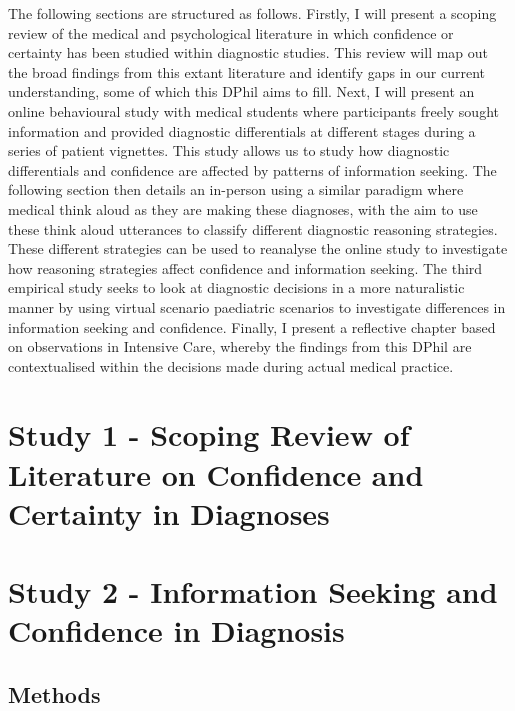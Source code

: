 \documentclass[a4paper, nobind]{templates/ociamthesis}
\begin{document}
The following sections are structured as follows. Firstly, I will present a scoping review of the medical and psychological literature in which confidence or certainty has been studied within diagnostic studies. This review will map out the broad findings from this extant literature and identify gaps in our current understanding, some of which this DPhil aims to fill. Next, I will present an online behavioural study with medical students where participants freely sought information and provided diagnostic differentials at different stages during a series of patient vignettes. This study allows us to study how diagnostic differentials and confidence are affected by patterns of information seeking. The following section then details an in-person using a similar paradigm where medical think aloud as they are making these diagnoses, with the aim to use these think aloud utterances to classify different diagnostic reasoning strategies. These different strategies can be used to reanalyse the online study to investigate how reasoning strategies affect confidence and information seeking. The third empirical study seeks to look at diagnostic decisions in a more naturalistic manner by using virtual scenario paediatric scenarios to investigate differences in information seeking and confidence. Finally, I present a reflective chapter based on observations in Intensive Care, whereby the findings from this DPhil are contextualised within the decisions made during actual medical practice.

\chapter{Study 1 - Scoping Review of Literature on Confidence and Certainty in Diagnoses}\label{study-1---scoping-review-of-literature-on-confidence-and-certainty-in-diagnoses}

\adjustmtc
{}

\chapter*{Study 2 - Information Seeking and Confidence in Diagnosis}\label{study-2---information-seeking-and-confidence-in-diagnosis}

\adjustmtc
{}

\section*{Methods}\label{methods}
\end{document}
